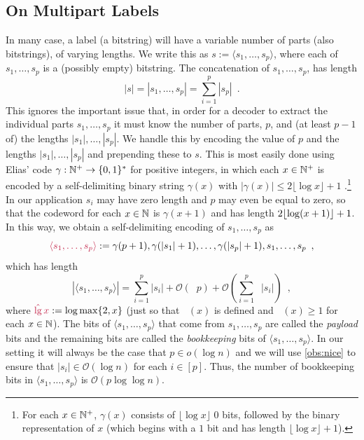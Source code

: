 \documentclass{patmorin}
\makeatletter
\renewcommand{\ge}{\geqslant}
\renewcommand{\le}{\leqslant}
\newcommand{\defin}[1]{\emph{\textcolor{brightmaroon}{#1}}}
\def\mathcolor#1#{\@mathcolor{#1}}
\def\@mathcolor#1#2#3{%
  \protect\leavevmode
  \begingroup
    \color#1{#2}#3%
  \endgroup
}
\newcommand{\mathdefin}[1]{\mathcolor{brightmaroon}{#1}}
\DeclareMathOperator{\lgg}{\hat{lg}}
\newcommand{\Oh}{\mathcal{O}}
\makeatother
\begin{document}
  \subsection{On Multipart Labels}
  \label{multipart}

  In many case, a label (a bitstring) will have a variable number of parts (also bitstrings), of varying lengths.  We write this as $s:=\langle s_1,\ldots,s_p\rangle$, where each of $s_1,\ldots,s_p$ is a (possibly empty) bitstring.  The concatenation of $s_1,\ldots,s_p$, has length
  \[
     \textstyle |s|=|s_1,\ldots,s_p|=\sum_{i=1}^p|s_p| \enspace .
  \]
  This ignores the important issue that, in order for a decoder to extract the individual parts $s_1,\ldots,s_p$ it must know the number of parts, $p$, and (at least $p-1$ of) the lengths $|s_1|,\ldots,|s_p|$.  We handle this by encoding the value of $p$ and the lengths $|s_1|,\ldots,|s_{p}|$ and prepending these to $s$. This is most easily done using Elias' code $\gamma:\mathbb{N}^+\to\{0,1\}^*$ for positive integers, in which each $x\in\mathbb{N}^+$ is encoded by a self-delimiting binary string $\gamma(x)$ with $|\gamma(x)|\le 2\lfloor \log x  \rfloor  + 1$ \cite{elias:universal}.\footnote{For each $x\in\mathbb{N}^+$, $\gamma(x)$ consists of $\lfloor\log x\rfloor$ 0 bits, followed by the binary representation of $x$ (which begins with a $1$ bit and has length $\lfloor\log x\rfloor+1$).} In our application $s_i$ may have zero length and $p$ may even be equal to zero, so that the codeword for each $x\in\mathbb{N}$ is $\gamma(x+1)$ and has length $2{\lfloor \log (x+1) \rfloor}+1$.
  In this way, we obtain a self-delimiting encoding of $s_1,\ldots,s_p$ as
  \[  \mathdefin{\langle s_1,\ldots,s_p\rangle}:=\gamma(p+1),\gamma(|s_1|+1),\ldots,\gamma(|s_p|+1),s_1,\ldots,s_p \enspace ,
  \]
  which has length
  \begin{equation}
    |\langle s_1,\ldots,s_p\rangle| = \textstyle\sum_{i=1}^p|s_i|+\Oh(\lgg p) + \Oh(\sum_{i=1}^p\lgg|s_i|) \enspace , \label{encoding_cost}
  \end{equation}
  where $\mathdefin{\lgg x} := \log\max\{2,x\}$ (just so that $\lgg(x)$ is defined and $\lgg(x)\ge 1$ for each $x\in\mathbb{N}$).    The bits of $\langle s_1,\ldots,s_p\rangle$ that come from $s_1,\ldots,s_p$ are called the \defin{payload} bits and the remaining bits are called the \defin{bookkeeping} bits of $\langle s_1,\ldots,s_p\rangle$.
  In our setting it will always be the case that $p\in o(\log n)$ and we will use \cref{obs:nice} to ensure that $|s_i|\in \Oh(\log n)$ for each $i\in[p]$.
  Thus, the number of bookkeeping bits in $\langle s_1,\ldots,s_p\rangle$  is $\Oh(p\log\log n)$.
\end{document}
